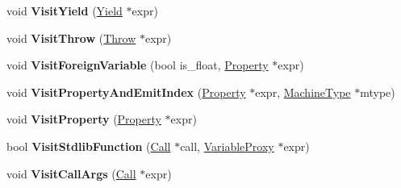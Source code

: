 \begin{DoxyCompactItemize}
\item 
void {\bfseries Visit\+Yield} (\hyperlink{classv8_1_1internal_1_1_yield}{Yield} $\ast$expr)\hypertarget{classv8_1_1internal_1_1wasm_1_1_asm_wasm_builder_impl_a4c277387cd5f19a1ba9a0688f71a284d}{}\label{classv8_1_1internal_1_1wasm_1_1_asm_wasm_builder_impl_a4c277387cd5f19a1ba9a0688f71a284d}

\item 
void {\bfseries Visit\+Throw} (\hyperlink{classv8_1_1internal_1_1_throw}{Throw} $\ast$expr)\hypertarget{classv8_1_1internal_1_1wasm_1_1_asm_wasm_builder_impl_a745857b6a36836c028df3f023214584a}{}\label{classv8_1_1internal_1_1wasm_1_1_asm_wasm_builder_impl_a745857b6a36836c028df3f023214584a}

\item 
void {\bfseries Visit\+Foreign\+Variable} (bool is\+\_\+float, \hyperlink{classv8_1_1internal_1_1_property}{Property} $\ast$expr)\hypertarget{classv8_1_1internal_1_1wasm_1_1_asm_wasm_builder_impl_acfe556a25283de8b05eb587a5339c103}{}\label{classv8_1_1internal_1_1wasm_1_1_asm_wasm_builder_impl_acfe556a25283de8b05eb587a5339c103}

\item 
void {\bfseries Visit\+Property\+And\+Emit\+Index} (\hyperlink{classv8_1_1internal_1_1_property}{Property} $\ast$expr, \hyperlink{classv8_1_1internal_1_1_machine_type}{Machine\+Type} $\ast$mtype)\hypertarget{classv8_1_1internal_1_1wasm_1_1_asm_wasm_builder_impl_aafcd555e33e15e27e2a9e1081b75d41f}{}\label{classv8_1_1internal_1_1wasm_1_1_asm_wasm_builder_impl_aafcd555e33e15e27e2a9e1081b75d41f}

\item 
void {\bfseries Visit\+Property} (\hyperlink{classv8_1_1internal_1_1_property}{Property} $\ast$expr)\hypertarget{classv8_1_1internal_1_1wasm_1_1_asm_wasm_builder_impl_a5da6ceebab449cd733737aae67d5f7b0}{}\label{classv8_1_1internal_1_1wasm_1_1_asm_wasm_builder_impl_a5da6ceebab449cd733737aae67d5f7b0}

\item 
bool {\bfseries Visit\+Stdlib\+Function} (\hyperlink{classv8_1_1internal_1_1_call}{Call} $\ast$call, \hyperlink{classv8_1_1internal_1_1_variable_proxy}{Variable\+Proxy} $\ast$expr)\hypertarget{classv8_1_1internal_1_1wasm_1_1_asm_wasm_builder_impl_adc0ec90798251217a4a007f04c130c2c}{}\label{classv8_1_1internal_1_1wasm_1_1_asm_wasm_builder_impl_adc0ec90798251217a4a007f04c130c2c}

\item 
void {\bfseries Visit\+Call\+Args} (\hyperlink{classv8_1_1internal_1_1_call}{Call} $\ast$expr)\hypertarget{classv8_1_1internal_1_1wasm_1_1_asm_wasm_builder_impl_a2fea95dbf367b20c71c4b73625ad93e3}{}\label{classv8_1_1internal_1_1wasm_1_1_asm_wasm_builder_impl_a2fea95dbf367b20c71c4b73625ad93e3}


\end{DoxyCompactItemize}
